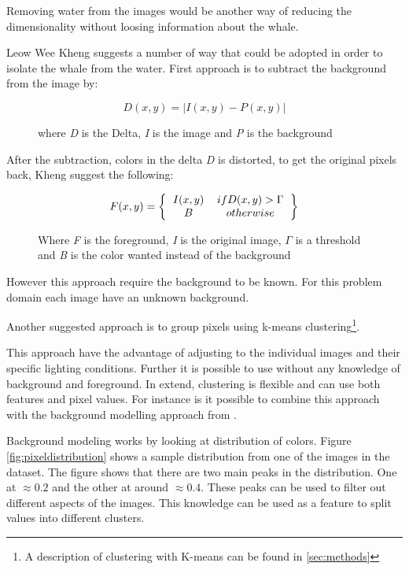 Removing water from the images would be another way of reducing the dimensionality without loosing information about the whale.

Leow Wee Kheng suggests a number of way that could be adopted in order to isolate the whale from the water\cite{backgroundRemoval}.
First approach is to subtract the background from the image by:
\begin{figure}[H]
\begin{equation}
D(x,y) = |I(x,y) - P(x,y)|
\end{equation}
\caption{where \emph{D} is the Delta, \emph{I} is the image and \emph{P} is the background}
\end{figure}

After the subtraction, colors in the delta \emph{D} is distorted, to get the original pixels back, Kheng suggest the following:

\begin{figure}[H]
\begin{equation}
F(x,y) = \left \{
\begin{tabular}{cc}
$I(x,y)$ & $if D(x,y) > \Gamma$ \\
$B$      & $otherwise$
\end{tabular}  
\right \}
\end{equation}
\caption{Where \emph{F} is the foreground, \emph{I} is the original image, $\Gamma$ is a threshold and \emph{B} is the color wanted instead of the background}
\end{figure}

However this approach require the background to be known. For this problem domain each image have an unknown background.

Another suggested approach is to group pixels using k-means clustering\footnote{A description of clustering with K-means can be found in \ref{sec:methods}}.

This approach have the advantage of adjusting to the individual images and their specific lighting conditions. Further it is possible to use without any knowledge of background and foreground. 
In extend, clustering is flexible and can use both features and pixel values.
For instance is it possible to combine this approach with the background modelling approach from \cite{backgroundRemoval}.
  
Background modeling works by looking at distribution of colors. Figure \ref{fig:pixeldistribution} shows a sample distribution from one of the images in the dataset. The figure shows that there are two main peaks in the distribution. One at \(\approx0.2\) and the other at around \(\approx0.4\). 
These peaks can be used to filter out different aspects of the images. This knowledge can be used as a feature to split values into different clusters.
 
